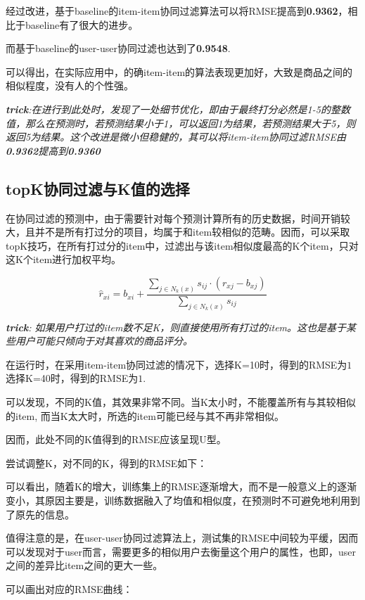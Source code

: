 \documentclass[utf8, a4paper,12pt, onecolumn]{ctexart}
\begin{document}
\begin{spacing}{1.3}
经过改进，基于baseline的item-item协同过滤算法可以将RMSE提高到\textbf{0.9362}，相比于baseline有了很大的进步。

而基于baseline的user-user协同过滤也达到了\textbf{0.9548}.

可以得出，在实际应用中，的确item-item的算法表现更加好，大致是商品之间的相似程度，没有人的个性强。

\textit{\textbf{trick}:在进行到此处时，发现了一处细节优化，即由于最终打分必然是1-5的整数值，那么在预测时，若预测结果小于1，可以返回1为结果，若预测结果大于5，则返回5为结果。这个改进是微小但稳健的，其可以将item-item协同过滤RMSE由\textbf{0.9362}提高到\textbf{0.9360}}

\subsection{topK协同过滤与K值的选择}

在协同过滤的预测中，由于需要针对每个预测计算所有的历史数据，时间开销较大，且并不是所有打过分的项目，均属于和item较相似的范畴。因而，可以采取topK技巧，在所有打过分的item中，过滤出与该item相似度最高的K个item，只对这K个item进行加权平均。

\[\hat{r}_{xi} = b_{xi}  + \frac{\sum_{j \in N_k(x)} s_{ij} \cdot (r_{xj} - b_{xj})}{\sum_{j \in N_k(x)} s_{ij}} \]

\textit{\textbf{trick}: 如果用户打过的item数不足K，则直接使用所有打过的item。这也是基于某些用户可能只倾向于对其喜欢的商品评分。}

在运行时，在采用item-item协同过滤的情况下，选择K=10时，得到的RMSE为$1$选择K=40时，得到的RMSE为$1$.

可以发现，不同的K值，其效果非常不同。当K太小时，不能覆盖所有与其较相似的item, 而当K太大时，所选的item可能已经与其不再非常相似。

因而，此处不同的K值得到的RMSE应该呈现U型。

尝试调整K，对不同的K，得到的RMSE如下：


可以看出，随着K的增大，训练集上的RMSE逐渐增大，而不是一般意义上的逐渐变小，其原因主要是，训练数据融入了均值和相似度，在预测时不可避免地利用到了原先的信息。

值得注意的是，在user-user协同过滤算法上，测试集的RMSE中间较为平缓，因而可以发现对于user而言，需要更多的相似用户去衡量这个用户的属性，也即，user之间的差异比item之间的更大一些。

可以画出对应的RMSE曲线：



\end{spacing}
\end{document}
